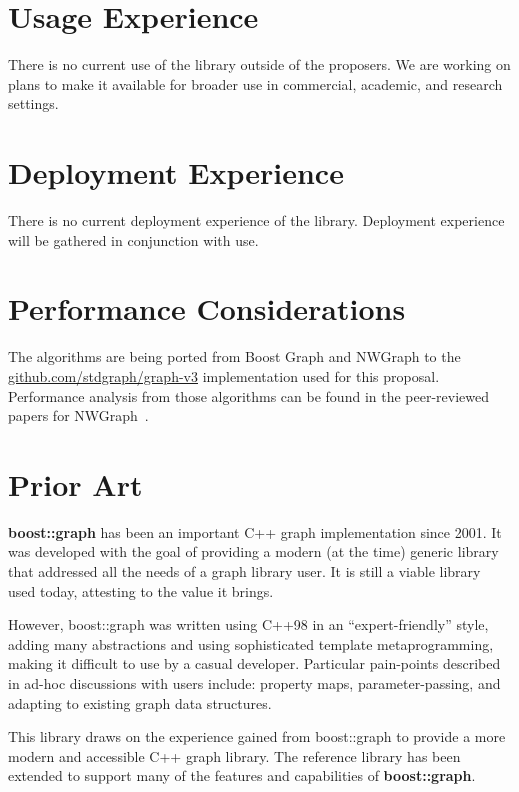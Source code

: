 \section{Usage Experience}
There is no current use of the library outside of the proposers. We are working on plans to make it available for broader use in commercial, academic, and research settings.

\section{Deployment Experience}
There is no current deployment experience of the library. Deployment experience will be gathered in conjunction with use.

\section{Performance Considerations}
The algorithms are being ported from Boost Graph and NWGraph to the \href{https://github.com/stdgraph/graph-v3}{github.com/stdgraph/graph-v3} 
implementation used for this proposal. Performance analysis from those algorithms can be found in the peer-reviewed papers for NWGraph~\cite{REF_nwgraph_paper,gapbs_2023}.

\section{Prior Art}


\textbf{boost::graph} has been an important C++ graph implementation since 2001. It was developed with the goal of providing
a modern (at the time) generic library that addressed all the needs of a graph library user. It is still a viable library used today, 
attesting to the value it brings.

However, boost::graph was written using C++98 in an ``expert-friendly'' style, adding many abstractions and using sophisticated 
template metaprogramming, making it difficult to use by a casual developer.  Particular pain-points described in ad-hoc discussions 
with users  include: property maps, parameter-passing, and adapting to existing graph data structures.

This library draws on the experience gained from boost::graph to provide a more modern and accessible C++ graph library.
The reference library has been extended to support many of the features and capabilities of \textbf{boost::graph}.

